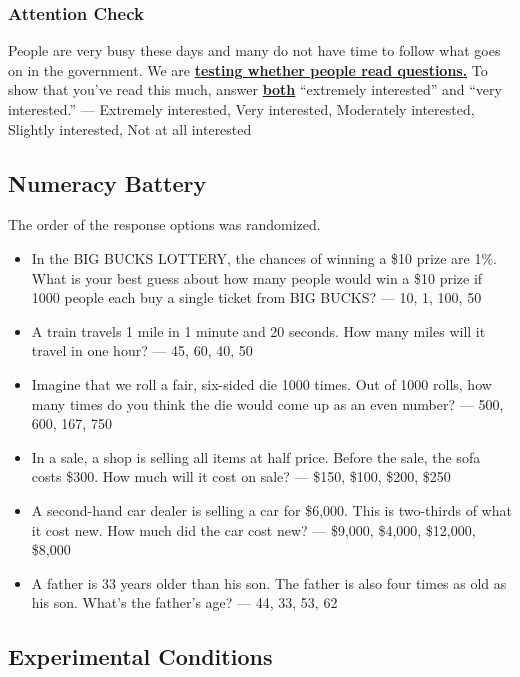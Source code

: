 \documentclass[12pt, letterpaper]{article}
\begin{document}
\subsubsection{Attention Check}
People are very busy these days and many do not have time to follow what goes on in the government. We are \textbf{\underline{testing whether people read questions.}} To show that you've read this much, answer \textbf{\underline{both}} ``extremely interested'' and ``very interested.'' --- Extremely interested, Very interested,  Moderately interested, Slightly interested, Not at all interested

\subsection{Numeracy Battery}

The order of the response options was randomized.

\begin{itemize}
    \item In the BIG BUCKS LOTTERY, the chances of winning a \$10 prize are 1\%. What is your best guess about how many people would win a \$10 prize if 1000 people each buy a single ticket from BIG BUCKS? — 10, 1, 100, 50
    
    \item A train travels 1 mile in 1 minute and 20 seconds. How many miles will it travel in one hour? — 45, 60, 40, 50
    
    \item Imagine that we roll a fair, six-sided die 1000 times. Out of 1000 rolls, how many times do you think the die would come up as an even number? — 500, 600, 167, 750
    
    \item In a sale, a shop is selling all items at half price. Before the sale, the sofa costs \$300. How much will it cost on sale? — \$150, \$100, \$200, \$250
    
    \item A second-hand car dealer is selling a car for \$6,000. This is two-thirds of what it cost new. How much did the car cost new? — \$9,000, \$4,000, \$12,000, \$8,000
    
    \item A father is 33 years older than his son. The father is also four times as old as his son. What's the father’s age? — 44, 33, 53, 62
\end{itemize}

\subsection{Experimental Conditions}
\end{document}
